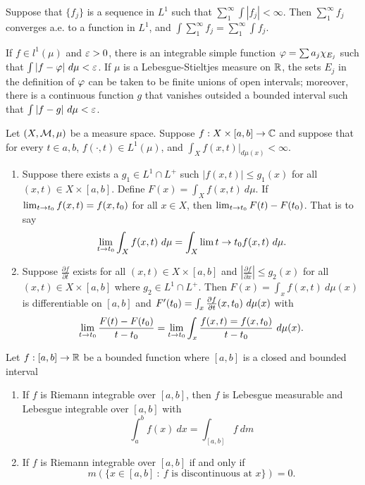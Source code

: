 \vs

\begin{thm}
Suppose that $\{f_j\}$ is a sequence in $L^1$ such that $\sum_1^\infty \int |f_j| < \infty$. Then $\sum_1^\infty f_j$ converges a.e. to a function in $L^1$, and $\int\sum_1^\infty f_j = \sum_1^\infty \int f_j$.
\end{thm}

\vs

\begin{thm}
If $f\in l^1(\mu)$ and $\varepsilon > 0$, there is an integrable simple function $\varphi = \sum a_j \chi_{E_j}$ such that $\int|f -\vphi|\ d\mu < \vep$. If $\mu$ is a Lebesgue-Stieltjes measure on $\mathbb{R}$, the sets $E_j$ in the definition of $\varphi$ can be taken to be finite unions of open intervals; moreover, there is a continuous function $g$ that vanishes outsided a bounded interval such that $\int |f - g|\ d\mu < \varepsilon$.
\end{thm}

\vs

\begin{thm}
Let $(X, \mathcal{M}, \mu)$ be a measure space. Suppose $f: X\times [a,b] \rightarrow \mathbb{C}$ and suppose that for every $t\in a,b$, $f(\cdot, t)\in L^1(\mu)$, and $\int_X f(x, t)|_{d\mu(x)} < \infty$.
\begin{enumerate}
    \item Suppose there exists a $g_1\in L^1\cap L^+$ such $|f(x,t)| \leq g_1(x)$ for all $(x,t)\in X\times [a,b]$. Define $F(x) = \int_X f(x,t)\ d\mu$. If $\lim_{t\rightarrow t_0} f(x, t) = f(x, t_0)$ for all $x\in X$, then $\lim_{t\rightarrow t_0} F(t) - F(t_0)$. That is to say
    \[\lim_{t\rightarrow t_0}\int_X f(x,t)\ d\mu = \int_X\lim{t\rightarrow t_0} f(x,t)\ d\mu.\]
    
    \item Suppose $\frac{\partial f}{\partial t}$ exists for all $(x, t) \in X\times [a,b]$ and $|\frac{\partial f}{\partial x}| \leq g_2(x)$ for all $(x, t) \in X\times [a,b]$ where $g_2\in L^1\cap L^+$. Then $F(x) = \int_x f(x,t)\ d\mu(x)$ is differentiable on $[a,b]$ and $F^\prime(t_0) = \int_x \frac{\partial f}{\partial t}(x, t_0)\ d\mu(x)$ with
    \[\lim_{t\ra t_0} \frac{F(t) - F(t_0)}{t - t_0} = \lim_{t\ra t_0}\int_x \frac{f(x,t) = f(x,t_0)}{t-t_0}\ d\mu(x).\]
    \end{enumerate}
\end{thm}

\vs

\begin{thm}
Let $f:[a,b]\rightarrow \mathbb{R}$ be a bounded function where $[a,b]$ is a closed and bounded interval
\begin{enumerate}
    \item If $f$ is Riemann integrable over $[a,b]$, then $f$ is Lebesgue measurable and Lebesgue integrable over $[a,b]$ with
    \[\int_a^b f(x)\ dx = \int_{[a,b]}f\ dm \]
    \item If $f$ is Riemann integrable over $[a,b]$ if and only if 
    \[m(\{x\in [a,b]\ :\ f \text{ is discontinuous at } x\}) = 0.\]
    
\end{enumerate}
\end{thm}

